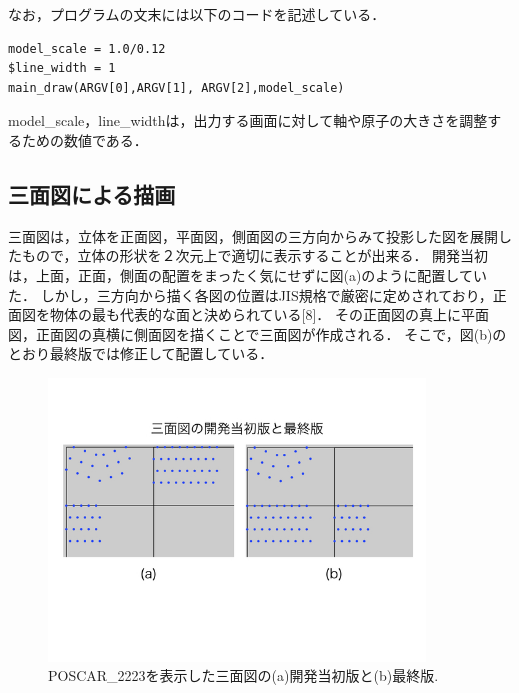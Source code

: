 なお，プログラムの文末には以下のコードを記述している．
\begin{lstlisting}[style=customRuby,basicstyle={\scriptsize\ttfamily}]
model_scale = 1.0/0.12
$line_width = 1
main_draw(ARGV[0],ARGV[1], ARGV[2],model_scale)
\end{lstlisting}
model\_scale，line\_widthは，出力する画面に対して軸や原子の大きさを調整するための数値である．

\subsection{三面図による描画}
三面図は，立体を正面図，平面図，側面図の三方向からみて投影した図を展開したもので，立体の形状を２次元上で適切に表示することが出来る．
開発当初は，上面，正面，側面の配置をまったく気にせずに図(a)のように配置していた．
しかし，三方向から描く各図の位置はJIS規格で厳密に定めされており，正面図を物体の最も代表的な面と決められている[8]．
その正面図の真上に平面図，正面図の真横に側面図を描くことで三面図が作成される．
そこで，図(b)のとおり最終版では修正して配置している．

\begin{figure}[htbp]\begin{center}
\includegraphics[width=10cm,bb= 0 0 737 553]{../figs/./boundary_narita.014.jpeg}
\caption{POSCAR\_2223を表示した三面図の(a)開発当初版と(b)最終版.}
\label{default}\end{center}\end{figure}
